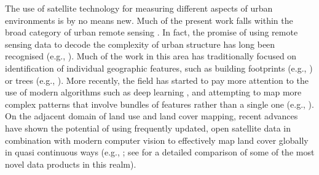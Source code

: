 The use of satellite technology for measuring different aspects of urban
environments is by no means new.
Much of the present work falls within the
broad category of urban remote sensing \citep{rashed2010remote, weng2018urban,
yang2021urban}. In fact, the promise of using remote sensing data to decode
the complexity of urban structure has long been recognised (e.g.,
\citealp{longley2002geographical}).
Much of the work in this area has traditionally focused on identification of
individual geographic features, such as building footprints (e.g.,
\citealp{microsoft2019}) or trees (e.g., \citealp{ke2011review}). More
recently, the field has started to pay more attention to the use of
modern algorithms such as deep learning \citep{lai2021deep}, and attempting to
map more complex patterns that involve bundles of features rather than a single
one (e.g., \citealp{kuffer2021mapping}).
On the adjacent domain of land use and land cover mapping, recent advances
have shown the potential of using frequently updated, open satellite data in
combination with modern computer vision to effectively map land cover globally
in quasi continuous ways
(e.g., \citealp{karra2021global, brown2022dynamic}; see \citealp{venter2022global} for a 
detailed comparison of some of the most novel data products in this realm).

